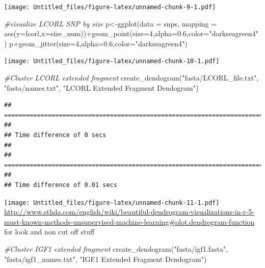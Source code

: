 \documentclass[
]{article}
\newenvironment{Shaded}{\begin{snugshade}}{\end{snugshade}}
\newcommand{\AttributeTok}[1]{\textcolor[rgb]{0.77,0.63,0.00}{#1}}
\newcommand{\CommentTok}[1]{\textcolor[rgb]{0.56,0.35,0.01}{\textit{#1}}}
\newcommand{\DecValTok}[1]{\textcolor[rgb]{0.00,0.00,0.81}{#1}}
\newcommand{\FloatTok}[1]{\textcolor[rgb]{0.00,0.00,0.81}{#1}}
\newcommand{\FunctionTok}[1]{\textcolor[rgb]{0.00,0.00,0.00}{#1}}
\newcommand{\NormalTok}[1]{#1}
\newcommand{\OtherTok}[1]{\textcolor[rgb]{0.56,0.35,0.01}{#1}}
\newcommand{\SpecialCharTok}[1]{\textcolor[rgb]{0.00,0.00,0.00}{#1}}
\newcommand{\StringTok}[1]{\textcolor[rgb]{0.31,0.60,0.02}{#1}}
\begin{document}
\texttt{[image: Untitled\_files/figure-latex/unnamed-chunk-9-1.pdf]}

\begin{Shaded}
\begin{Highlighting}[]
\CommentTok{\#visualize LCORL SNP by size }
\NormalTok{p}\OtherTok{\textless{}{-}}\FunctionTok{ggplot}\NormalTok{(}\AttributeTok{data =}\NormalTok{ snps, }\AttributeTok{mapping =} \FunctionTok{aes}\NormalTok{(}\AttributeTok{y=}\NormalTok{lcorl,}\AttributeTok{x=}\NormalTok{size\_num))}\SpecialCharTok{+}\FunctionTok{geom\_point}\NormalTok{(}\AttributeTok{size=}\DecValTok{4}\NormalTok{,}\AttributeTok{alpha=}\FloatTok{0.6}\NormalTok{,}\AttributeTok{color=}\StringTok{"darkseagreen4"}\NormalTok{)}
\NormalTok{p}\SpecialCharTok{+}\FunctionTok{geom\_jitter}\NormalTok{(}\AttributeTok{size=}\DecValTok{4}\NormalTok{,}\AttributeTok{alpha=}\FloatTok{0.6}\NormalTok{,}\AttributeTok{color=}\StringTok{"darkseagreen4"}\NormalTok{)}
\end{Highlighting}
\end{Shaded}

\texttt{[image: Untitled\_files/figure-latex/unnamed-chunk-10-1.pdf]}

\begin{Shaded}
\begin{Highlighting}[]
\CommentTok{\#Cluster LCORL extended fragment }
\FunctionTok{create\_dendogram}\NormalTok{(}\StringTok{"fasta/LCORL\_file.txt"}\NormalTok{, }\StringTok{"fasta/names.txt"}\NormalTok{, }\StringTok{"LCORL Extended Fragment Dendogram"}\NormalTok{)}
\end{Highlighting}
\end{Shaded}

\begin{verbatim}
## ================================================================================
## 
## Time difference of 0 secs
## 
## ================================================================================
## 
## Time difference of 0.01 secs
\end{verbatim}

\texttt{[image: Untitled\_files/figure-latex/unnamed-chunk-11-1.pdf]}
\url{http://www.sthda.com/english/wiki/beautiful-dendrogram-visualizations-in-r-5-must-known-methods-unsupervised-machine-learning\#plot.dendrogram-function}
for look and non cut off stuff

\begin{Shaded}
\begin{Highlighting}[]
\CommentTok{\#Cluster IGF1 extended fragment }
\FunctionTok{create\_dendogram}\NormalTok{(}\StringTok{"fasta/igf1.fasta"}\NormalTok{, }\StringTok{"fasta/igf1\_names.txt"}\NormalTok{, }\StringTok{"IGF1 Extended Fragment Dendogram"}\NormalTok{)}
\end{Highlighting}
\end{Shaded}
\end{document}
